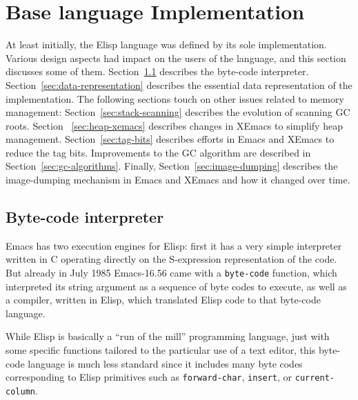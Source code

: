 \documentclass[format=acmsmall, review=false, screen=true]{acmart}
\newcommand \Elisp {Elisp}
\begin{document}
\section{Base language Implementation}
\label{sec:base-language-implementation}

At least initially, the \Elisp{} language was defined by its sole
implementation.  Various design aspects had impact on the users of the
language, and this section discusses some of them.
Section~\ref{sec:byte-code-interpreter} describes the byte-code
interpreter.  Section~\ref{sec:data-representation} describes the
essential data representation of the implementation.  The following
sections touch on other issues related to memory management:
Section~\ref{sec:stack-scanning} describes the evolution of scanning
GC roots. Section ~\ref{sec:heap-xemacs} describes changes in XEmacs
to simplify heap management.  Section~\ref{sec:tag-bits} describes
efforts in Emacs and XEmacs to reduce the tag bits.  Improvements to
the GC algorithm are described in Section~\ref{sec:gc-algorithms}.
Finally, Section~\ref{sec:image-dumping} describes the
image-dumping mechanism in Emacs and XEmacs and how it changed over time.

\subsection{Byte-code interpreter}
\label{sec:byte-code-interpreter}


Emacs has two execution engines for \Elisp: first it has a very simple
interpreter written in C operating directly on the S-expression
representation of the code.  But already in July 1985 Emacs-16.56 came with
a \texttt{byte-code} function, which interpreted its string argument as
a sequence of byte codes to execute, as well as a compiler, written in
\Elisp{}, which translated \Elisp{} code to that byte-code language.

While \Elisp{} is basically a ``run of the mill'' programming language, just
with some specific functions tailored to the particular use of a text
editor, this byte-code language is much less standard since it includes many
byte codes corresponding to \Elisp{} primitives such as
\texttt{forward-char}, \texttt{insert}, or \texttt{current-column}.
\end{document}
